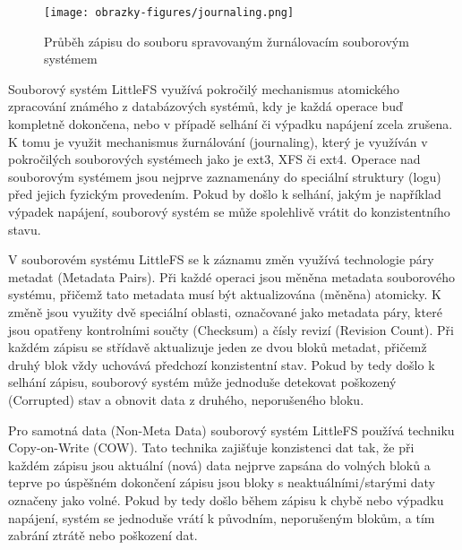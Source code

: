 \begin{figure}[h]
    \centering
    \texttt{[image: obrazky-figures/journaling.png]}
    
    \caption{Průběh zápisu do souboru spravovaným žurnálovacím souborovým systémem \cite{architecture_and_design_of_the_linux_storage_stack}}
    \label{fig:journaling}
\end{figure}


Souborový systém LittleFS využívá pokročilý mechanismus atomického zpracování známého z databázových systémů, kdy je každá operace buď kompletně dokončena, nebo v případě selhání či výpadku napájení zcela zrušena. K tomu je využit mechanismus žurnálování (journaling), který je využíván v pokročilých souborových systémech jako je ext3, XFS či ext4. Operace nad souborovým systémem jsou nejprve zaznamenány do speciální struktury (logu) před jejich fyzickým provedením. Pokud by došlo k selhání, jakým je například výpadek napájení, souborový systém se může spolehlivě vrátit do konzistentního stavu.

V souborovém systému LittleFS se k záznamu změn využívá technologie páry metadat (Metadata Pairs). Při každé operaci jsou měněna metadata souborového systému, přičemž tato metadata musí být aktualizována (měněna) atomicky. K změně jsou využity dvě speciální oblasti, označované jako metadata páry, které jsou opatřeny kontrolními součty (Checksum) a čísly revizí (Revision Count). Při každém zápisu se střídavě aktualizuje jeden ze dvou bloků metadat, přičemž druhý blok vždy uchovává předchozí konzistentní stav. Pokud by tedy došlo k selhání zápisu, souborový systém může jednoduše detekovat poškozený (Corrupted) stav a obnovit data z druhého, neporušeného bloku. \cite{nxp_the_design_of_the_little_filesystem}

Pro samotná data (Non-Meta Data) souborový systém LittleFS používá techniku Copy-on-Write (COW). Tato technika zajišťuje konzistenci dat tak, že při každém zápisu jsou aktuální (nová) data nejprve zapsána do volných bloků a teprve po úspěšném dokončení zápisu jsou bloky s neaktuálními/starými daty označeny jako volné. Pokud by tedy došlo během zápisu k chybě nebo výpadku napájení, systém se jednoduše vrátí k původním, neporušeným blokům, a tím zabrání ztrátě nebo poškození dat. \cite{nxp_the_design_of_the_little_filesystem}

